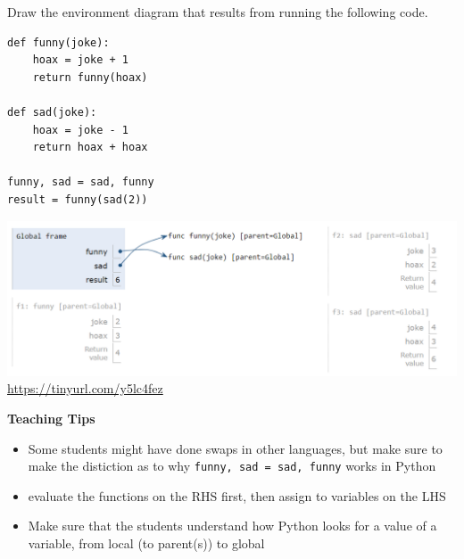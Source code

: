 \begin{blocksection}
\question Draw the environment diagram that results from running the following code.

\begin{lstlisting}
def funny(joke):
    hoax = joke + 1
    return funny(hoax)

def sad(joke):
    hoax = joke - 1
    return hoax + hoax

funny, sad = sad, funny
result = funny(sad(2))
\end{lstlisting}
\begin{solution}[2in]
\includegraphics[scale=0.5]{joke.png}
\\
\url{https://tinyurl.com/y5lc4fez}
\end{solution}
\end{blocksection}

\begin{questionmeta}
    \textbf{Teaching Tips}
      \begin{itemize}
        \item Some students might have done swaps in other languages, but make sure to make the distiction as to why \lstinline{funny, sad = sad, funny} works in Python
        \item evaluate the functions on the RHS first, then assign to variables on the LHS
        \item Make sure that the students understand how Python looks for a value of a variable, from local (to parent(s)) to global
      \end{itemize}
    \end{questionmeta}
    
